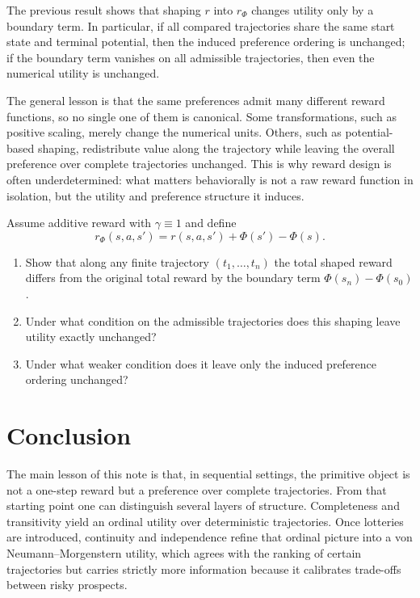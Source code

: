\documentclass[11pt]{article}
\begin{document}
The previous result shows that shaping $r$ into $r_\Phi$ changes utility only by a boundary term. 
In particular, if all
compared trajectories share the same start state and terminal potential, then
the induced preference ordering is unchanged; if the boundary term vanishes on
all admissible trajectories, then even the numerical utility is unchanged.

The general lesson is that the same preferences admit many different reward
functions, so no single one of them is canonical. Some transformations,
such as positive scaling, merely change the numerical units. Others, such as
potential-based shaping, redistribute value along the trajectory while leaving
the overall preference over complete trajectories unchanged. This is why reward
design is often underdetermined: what matters behaviorally is not a raw reward
function in isolation, but the utility and preference structure it induces.

\begin{exercise}
\label{ex:reward-shaping}
Assume additive reward with $\gamma\equiv 1$ and define
\[
r_\Phi(s,a,s')=r(s,a,s')+\Phi(s')-\Phi(s).
\]
\begin{enumerate}[label=(\alph*)]
\item Show that along any finite trajectory $(t_1,\dots,t_n)$ the total shaped
reward differs from the original total reward by the boundary term
$\Phi(s_n)-\Phi(s_0)$.
\item Under what condition on the admissible trajectories does this shaping
leave utility exactly unchanged?
\item Under what weaker condition does it leave only the induced preference
ordering unchanged?
\end{enumerate}
\end{exercise}

\section{Conclusion}

The main lesson of this note is that, in sequential settings, the primitive
object is not a one-step reward but a preference over complete trajectories.
From that starting point one can distinguish several layers of structure.
Completeness and transitivity yield an ordinal utility over deterministic
trajectories. Once lotteries are introduced, continuity and independence refine
that ordinal picture into a von Neumann--Morgenstern utility, which agrees with
the ranking of certain trajectories but carries strictly more information
because it calibrates trade-offs between risky prospects.
\end{document}

